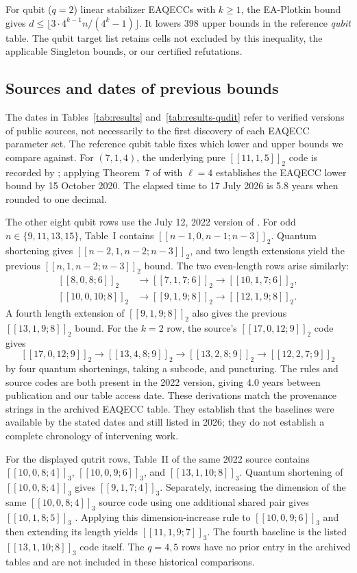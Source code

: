 \documentclass{article}
\begin{document}
For qubit ($q=2$) linear stabilizer EAQECCs with $k\ge1$, the
EA-Plotkin bound~\citep{GuoLi2013} gives
$d\le\lfloor3\cdot4^{k-1}n/(4^k-1)\rfloor$.
It lowers 398 upper bounds in the reference \emph{qubit} table.
The qubit target list retains cells not excluded by this inequality,
the applicable Singleton bounds, or our certified refutations.

\subsection{Sources and dates of previous bounds}\label{app:bound-history}
The dates in Tables~\ref{tab:results} and~\ref{tab:results-qudit} refer to
verified versions of public
sources, not necessarily to the first discovery of each EAQECC parameter
set. The reference qubit table fixes which lower and upper bounds we compare
against. For $(7,1,4)$, the underlying pure $[[11,1,5]]_2$ code is
recorded by \citet{CRSS1997}; applying Theorem~7 of \citet{GHW2020}
with $\ell=4$ establishes the EAQECC lower bound by 15 October 2020.
The elapsed time to 17 July 2026 is 5.8 years when rounded to one decimal.

The other eight qubit rows use the July 12, 2022 version of \citet{Luo2022}.
For odd $n\in\{9,11,13,15\}$, Table~I contains
$[[n-1,0,n-1;n-3]]_2$. Quantum shortening gives
$[[n-2,1,n-2;n-3]]_2$, and two length extensions yield the previous
$[[n,1,n-2;n-3]]_2$ bound. The two even-length rows arise similarly:
\[
\begin{aligned}
 [[8,0,8;6]]_2 &\longrightarrow [[7,1,7;6]]_2
                  \longrightarrow [[10,1,7;6]]_2,\\
 [[10,0,10;8]]_2 &\longrightarrow [[9,1,9;8]]_2
                  \longrightarrow [[12,1,9;8]]_2.
\end{aligned}
\]
A fourth length extension of $[[9,1,9;8]]_2$ also gives the previous
$[[13,1,9;8]]_2$ bound. For the $k=2$ row, the source's
$[[17,0,12;9]]_2$ code gives
\[
 [[17,0,12;9]]_2 \longrightarrow [[13,4,8;9]]_2
 \longrightarrow [[13,2,8;9]]_2 \longrightarrow [[12,2,7;9]]_2
\]
by four quantum shortenings, taking a subcode, and puncturing.
The rules and source codes are both present in the 2022 version,
giving 4.0 years between publication and our table access date. These derivations match
the provenance strings in the archived EAQECC table. They establish that
the baselines were available by the stated dates and still listed in
2026; they do not establish a complete chronology of intervening work.

For the displayed qutrit rows, Table~II of the same 2022 source
contains $[[10,0,8;4]]_3$, $[[10,0,9;6]]_3$, and
$[[13,1,10;8]]_3$. Quantum shortening of $[[10,0,8;4]]_3$ gives $[[9,1,7;4]]_3$.
Separately, increasing the dimension of the same $[[10,0,8;4]]_3$
source code using one additional shared pair gives $[[10,1,8;5]]_3$
\citep[Section IV, rule (6)]{Luo2022}. Applying this dimension-increase rule to
$[[10,0,9;6]]_3$ and then extending its length yields
$[[11,1,9;7]]_3$. The fourth baseline is the listed
$[[13,1,10;8]]_3$ code itself. The $q=4,5$ rows have no prior entry in
the archived tables and are not included in these historical comparisons.
\end{document}
